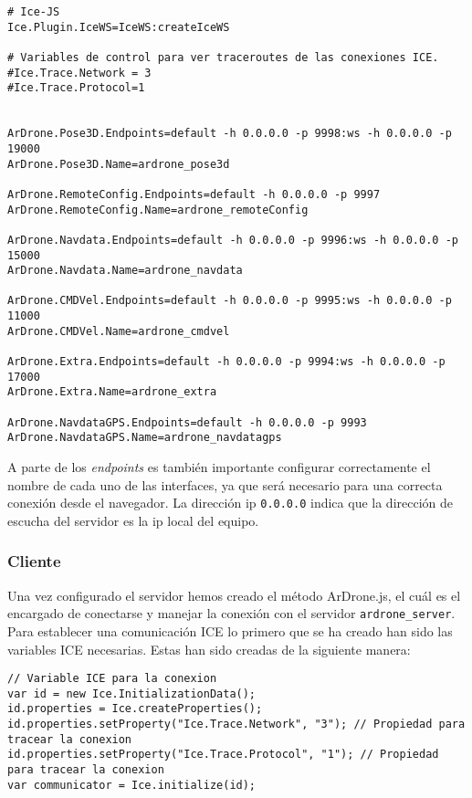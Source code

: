 \begin{lstlisting}[caption=Archivo de configuración de ArDrone\_Server.]
# Ice-JS
Ice.Plugin.IceWS=IceWS:createIceWS

# Variables de control para ver traceroutes de las conexiones ICE.
#Ice.Trace.Network = 3
#Ice.Trace.Protocol=1


ArDrone.Pose3D.Endpoints=default -h 0.0.0.0 -p 9998:ws -h 0.0.0.0 -p 19000
ArDrone.Pose3D.Name=ardrone_pose3d

ArDrone.RemoteConfig.Endpoints=default -h 0.0.0.0 -p 9997
ArDrone.RemoteConfig.Name=ardrone_remoteConfig

ArDrone.Navdata.Endpoints=default -h 0.0.0.0 -p 9996:ws -h 0.0.0.0 -p 15000
ArDrone.Navdata.Name=ardrone_navdata

ArDrone.CMDVel.Endpoints=default -h 0.0.0.0 -p 9995:ws -h 0.0.0.0 -p 11000
ArDrone.CMDVel.Name=ardrone_cmdvel

ArDrone.Extra.Endpoints=default -h 0.0.0.0 -p 9994:ws -h 0.0.0.0 -p 17000
ArDrone.Extra.Name=ardrone_extra

ArDrone.NavdataGPS.Endpoints=default -h 0.0.0.0 -p 9993
ArDrone.NavdataGPS.Name=ardrone_navdatagps
\end{lstlisting}

A parte de los \emph{endpoints} es también importante configurar correctamente el nombre de cada uno de las interfaces, ya que será necesario para una correcta conexión desde el navegador. La dirección ip \texttt{0.0.0.0} indica que la dirección de escucha del servidor es la ip local del equipo. \\


\subsubsection{Cliente}

Una vez configurado el servidor hemos creado el método ArDrone.js, el cuál es el encargado de conectarse y manejar la conexión con el servidor \texttt{ardrone\_server}.\\

Para establecer una comunicación ICE lo primero que se ha creado han sido las variables ICE necesarias. Estas han sido creadas de la siguiente manera:\\

\begin{lstlisting}[caption=Variables para la conexión ICE.]
// Variable ICE para la conexion
var id = new Ice.InitializationData();
id.properties = Ice.createProperties();
id.properties.setProperty("Ice.Trace.Network", "3"); // Propiedad para tracear la conexion
id.properties.setProperty("Ice.Trace.Protocol", "1"); // Propiedad para tracear la conexion
var communicator = Ice.initialize(id);
\end{lstlisting}

